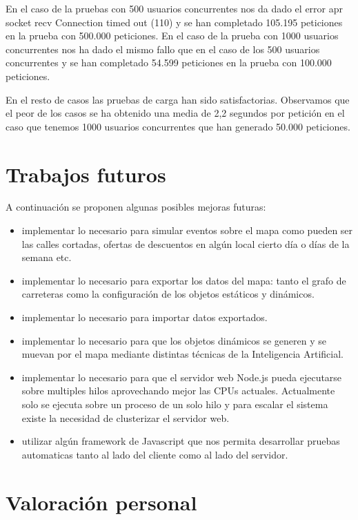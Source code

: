 En el caso de la pruebas con 500 usuarios concurrentes nos da dado el error apr socket recv Connection timed out (110) y se han completado 105.195 peticiones en la prueba con 500.000 peticiones. En el caso de la prueba con 1000 usuarios concurrentes nos ha dado el mismo fallo que en el caso de los 500 usuarios concurrentes y se han completado 54.599 peticiones en la prueba con 100.000 peticiones. 

En el resto de casos las pruebas de carga han sido satisfactorias. Observamos que el peor de los casos se ha obtenido una media de 2,2 segundos por petición en el caso que tenemos 1000 usuarios concurrentes que han generado 50.000 peticiones.

\section{Trabajos futuros}

A continuación se proponen algunas posibles mejoras futuras:

\begin{itemize}
	\item implementar lo necesario para simular eventos sobre el mapa como pueden ser las calles cortadas, ofertas de descuentos en algún local cierto día o días de la semana etc.
	\item implementar lo necesario para exportar los datos del mapa: tanto el grafo de carreteras como la configuración de los objetos estáticos y dinámicos.
	\item implementar lo necesario para importar datos exportados.
	\item implementar lo necesario para que los objetos dinámicos se generen y se muevan por el mapa mediante distintas técnicas de la Inteligencia Artificial.
	\item implementar lo necesario para que el servidor web Node.js pueda ejecutarse sobre multiples hilos aprovechando mejor las CPUs actuales. Actualmente solo se ejecuta sobre un proceso de un solo hilo y para escalar el sistema existe la necesidad de clusterizar el servidor web.
	\item utilizar algún framework de Javascript que nos permita desarrollar pruebas automaticas tanto al lado del cliente como al lado del servidor.
\end{itemize}

\section{Valoración personal}

